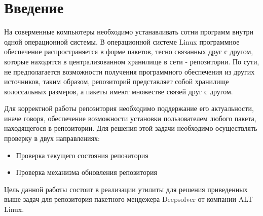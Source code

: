 \section*{Введение}
На соверменные компьютеры необходимо устанавливать сотни программ внутри
одной операционной системы. В операционной системе Linux программное 
обеспечение распространяется в форме пакетов, тесно связанных друг с другом,
которые находятся в централизованном хранилище в сети - репозитории. По
сути, не предполагается возможности получения программного обеспечения из 
других источников, таким образом, репозиторий представляет собой хранилище 
колоссальных размеров, а пакеты имеют множестве связей друг с другом.

Для корректной работы репозитория необходимо поддержание его актуальности, 
иначе говоря, обеспечение возможности установки пользователем любого пакета,
находящегося в репозитории. Для решения этой задачи необходимо осуществлять
проверку в двух направлениях: 
\begin{itemize}
\item{Проверка текущего состояния репозитория}
\item{Проверка механизма обновления репозитория}
\end{itemize}

Цель данной работы состоит в реализации утилиты для решения приведенных
выше задач для репозитория пакетного мендежера Deepsolver от компании
ALT Linux.









